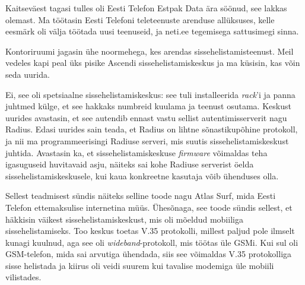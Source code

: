 Kaitseväest tagasi tulles oli Eesti 
Telefon Estpak Data ära söönud, see 
lakkas olemast. Ma töötasin Eesti Telefoni teleteenuste arenduse
allüksuses, kelle eesmärk oli välja töötada uusi teenuseid, ja neti.ee tegemisega sattusimegi sinna. 

Kontoriruumi jagasin ühe noormehega, kes arendas 
sissehelistamisteenust. Meil vedeles kapi peal üks pisike 
Ascendi sissehelistamiskeskus ja ma küsisin, 
kas võin seda uurida.


Ei, see oli spetsiaalne sissehelistamiskeskus: see tuli 
installeerida \emph{rack}'i ja panna juhtmed külge, et see hakkaks numbreid 
kuulama ja teenust osutama. Keskust 
uurides avastasin, et see autendib ennast 
vastu sellist autentimisserverit nagu Radius. Edasi uurides sain teada, et Radius on lihtne sõnastikupõhine protokoll, 
ja nii ma programmeerisingi Radiuse serveri, mis suutis 
sissehelistamiskeskust juhtida. Avastasin ka, et sissehelistamiskeskuse 
\emph{firmware} võimaldas teha igasuguseid huvitavaid asju, näiteks sai kohe Radiuse serverist öelda 
sissehelistamiskeskusele, kui kaua konkreetne kasutaja võib ühenduses olla. 

Sellest teadmisest sündis näiteks selline toode nagu Atlas Surf, mida 
Eesti Telefon ettemaksulise internetina müüs. Ühesõnaga, see toode sündis 
sellest, et häkkisin väikest sissehelistamiskeskust, mis oli 
mõeldud mobiiliga sissehelistamiseks. Too keskus toetas V.35 protokolli, millest paljud pole ilmselt kunagi 
kuulnud, aga see oli \emph{wideband}-protokoll, mis töötas üle GSMi. 
Kui sul oli GSM-telefon, mida sai arvutiga ühendada, siis see võimaldas V.35 protokolliga
sisse helistada ja kiirus oli veidi suurem kui 
tavalise modemiga üle mobiili vilistades. 

